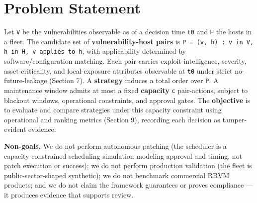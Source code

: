 \section{Problem Statement}

Let \texttt{V} be the vulnerabilities observable as of a decision time \texttt{t0} and \texttt{H} the
hosts in a fleet. The candidate set of \textbf{vulnerability-host pairs} is
\texttt{P = {(v, h) : v in V, h in H, v applies to h}}, with applicability determined by
software/configuration matching. Each pair carries exploit-intelligence, severity,
asset-criticality, and local-exposure attributes observable at \texttt{t0} under strict
no-future-leakage (Section 7). A \textbf{strategy} induces a total order over \texttt{P}. A
maintenance window admits at most a fixed \textbf{capacity} \texttt{c} pair-actions, subject to
blackout windows, operational constraints, and approval gates. The \textbf{objective} is
to evaluate and compare strategies under this capacity constraint using operational
and ranking metrics (Section 9), recording each decision as tamper-evident
evidence.

\textbf{Non-goals.} We do not perform autonomous patching (the scheduler is a
capacity-constrained scheduling simulation modeling approval and timing, not patch
execution or success); we do not perform production validation (the fleet is
public-sector-shaped synthetic); we do not benchmark commercial RBVM products; and
we do not claim the framework guarantees or proves compliance --- it produces
evidence that supports review.
